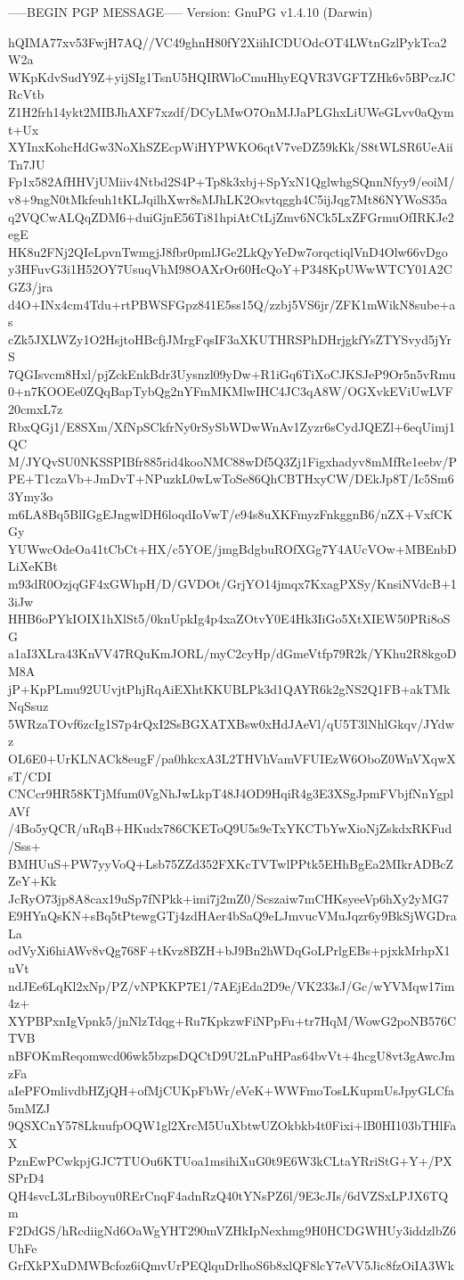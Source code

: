 -----BEGIN PGP MESSAGE-----
Version: GnuPG v1.4.10 (Darwin)

hQIMA77xv53FwjH7AQ//VC49ghnH80fY2XiihICDUOdcOT4LWtnGzlPykTca2W2a
WKpKdvSudY9Z+yijSIg1TsnU5HQIRWloCmuHhyEQVR3VGFTZHk6v5BPczJCRcVtb
Z1H2frh14ykt2MIBJhAXF7xzdf/DCyLMwO7OnMJJaPLGhxLiUWeGLvv0aQymt+Ux
XYInxKohcHdGw3NoXhSZEcpWiHYPWKO6qtV7veDZ59kKk/S8tWLSR6UeAiiTn7JU
Fp1x582AfHHVjUMiiv4Ntbd2S4P+Tp8k3xbj+SpYxN1QglwhgSQnnNfyy9/eoiM/
v8+9ngN0tMkfeuh1tKLJqilhXwr8sMJhLK2Osvtqggh4C5ijJqg7Mt86NYWoS35a
q2VQCwALQqZDM6+duiGjnE56Ti81hpiAtCtLjZmv6NCk5LxZFGrmuOfIRKJe2egE
HK8u2FNj2QIeLpvnTwmgjJ8fbr0pmlJGe2LkQyYeDw7orqctiqlVnD4Olw66vDgo
y3HFuvG3i1H52OY7UsuqVhM98OAXrOr60HcQoY+P348KpUWwWTCY01A2CGZ3/jra
d4O+INx4cm4Tdu+rtPBWSFGpz841E5ss15Q/zzbj5VS6jr/ZFK1mWikN8sube+as
cZk5JXLWZy1O2HsjtoHBcfjJMrgFqsIF3aXKUTHRSPhDHrjgkfYsZTYSvyd5jYrS
7QGIsvcm8Hxl/pjZckEnkBdr3Uysnzl09yDw+R1iGq6TiXoCJKSJeP9Or5n5vRmu
0+n7KOOEe0ZQqBapTybQg2nYFmMKMlwIHC4JC3qA8W/OGXvkEViUwLVF20cmxL7z
RbxQGj1/E8SXm/XfNpSCkfrNy0rSySbWDwWnAv1Zyzr6sCydJQEZl+6eqUimj1QC
M/JYQvSU0NKSSPIBfr885rid4kooNMC88wDf5Q3Zj1Figxhadyv8mMfRe1eebv/P
PE+T1czaVb+JmDvT+NPuzkL0wLwToSe86QhCBTHxyCW/DEkJp8T/Ic5Sm63Ymy3o
m6LA8Bq5BlIGgEJngwlDH6loqdIoVwT/e94s8uXKFmyzFnkggnB6/nZX+VxfCKGy
YUWwcOdeOa41tCbCt+HX/c5YOE/jmgBdgbuROfXGg7Y4AUcVOw+MBEnbDLiXeKBt
m93dR0OzjqGF4xGWhpH/D/GVDOt/GrjYO14jmqx7KxagPXSy/KnsiNVdcB+13iJw
HHB6oPYkIOIX1hXlSt5/0knUpkIg4p4xaZOtvY0E4Hk3IiGo5XtXIEW50PRi8oSG
a1aI3XLra43KnVV47RQuKmJORL/myC2cyHp/dGmeVtfp79R2k/YKhu2R8kgoDM8A
jP+KpPLmu92UUvjtPhjRqAiEXhtKKUBLPk3d1QAYR6k2gNS2Q1FB+akTMkNqSsuz
5WRzaTOvf6zcIg1S7p4rQxI2SsBGXATXBsw0xHdJAeVl/qU5T3lNhlGkqv/JYdwz
OL6E0+UrKLNACk8eugF/pa0hkcxA3L2THVhVamVFUIEzW6OboZ0WnVXqwXsT/CDI
CNCcr9HR58KTjMfum0VgNhJwLkpT48J4OD9HqiR4g3E3XSgJpmFVbjfNnYgplAVf
/4Bo5yQCR/uRqB+HKudx786CKEToQ9U5s9eTxYKCTbYwXioNjZskdxRKFud/Sss+
BMHUuS+PW7yyVoQ+Lsb75ZZd352FXKcTVTwlPPtk5EHhBgEa2MIkrADBcZZeY+Kk
JcRyO73jp8A8cax19uSp7fNPkk+imi7j2mZ0/Scszaiw7mCHKsyeeVp6hXy2yMG7
E9HYnQsKN+sBq5tPtewgGTj4zdHAer4bSaQ9eLJmvucVMuJqzr6y9BkSjWGDraLa
odVyXi6hiAWv8vQg768F+tKvz8BZH+bJ9Bn2hWDqGoLPrlgEBs+pjxkMrhpX1uVt
ndJEe6LqKl2xNp/PZ/vNPKKP7E1/7AEjEda2D9e/VK233sJ/Gc/wYVMqw17im4z+
XYPBPxnIgVpnk5/jnNlzTdqg+Ru7KpkzwFiNPpFu+tr7HqM/WowG2poNB576CTVB
nBFOKmReqomwcd06wk5bzpsDQCtD9U2LnPuHPas64bvVt+4hcgU8vt3gAwcJmzFa
aIePFOmlivdbHZjQH+ofMjCUKpFbWr/eVeK+WWFmoTosLKupmUsJpyGLCfa5mMZJ
9QSXCnY578LkuufpOQW1gl2XrcM5UuXbtwUZOkbkb4t0Fixi+lB0HI103bTHlFaX
PznEwPCwkpjGJC7TUOu6KTUoa1msihiXuG0t9E6W3kCLtaYRriStG+Y+/PXSPrD4
QH4svcL3LrBiboyu0RErCnqF4adnRzQ40tYNsPZ6l/9E3cJIs/6dVZSxLPJX6TQm
F2DdGS/hRcdiigNd6OaWgYHT290mVZHkIpNexhmg9H0HCDGWHUy3iddzlbZ6UhFe
GrfXkPXuDMWBcfoz6iQmvUrPEQlquDrlhoS6b8xlQF8lcY7eVV5Jic8fzOiIA3Wk
